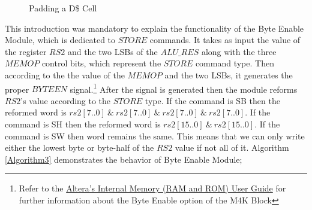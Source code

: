 \begin{figure}[h!]
	\begin{center}
		\caption{Padding a D\$ Cell}
		\label{Image3.12}
	\end{center}
\end{figure}

\vspace{-2mm}

This introduction was mandatory to explain the functionality of the Byte Enable Module, which is dedicated to $STORE$ commands. It takes as input the value of the register $RS2$ and the two LSBs of the $ALU\_RES$ along with the three $MEMOP$ control bits, which represent the $STORE$ command type. Then according to the the value of the $MEMOP$ and the two LSBs, it generates the proper $BYTEEN$ signal.\footnote{ Refer to the \href{https://www.intel.com/content/dam/www/programmable/us/en/pdfs/literature/an/an207.pdf}{Altera's Internal Memory (RAM and ROM) User Guide} for further information about the Byte Enable option of the M4K Block} After the signal is generated then the module reforms $RS2$'s value according to the $STORE$ type. If the command is SB then the reformed word is \underline{$rs2[7..0] \ \& \ rs2[7..0] \ \& \ rs2[7..0] \ \& \ rs2[7..0]$}. If the command is SH then the reformed word is \underline{$rs2[15..0] \ \& \ rs2[15..0]$}. If the command is SW then word remains the same. This means that we can only write either the lowest byte or byte-half of the $RS2$ value if not all of it. Algorithm \ref{Algorithm3} demonstrates the behavior of Byte Enable Module;

\clearpage

